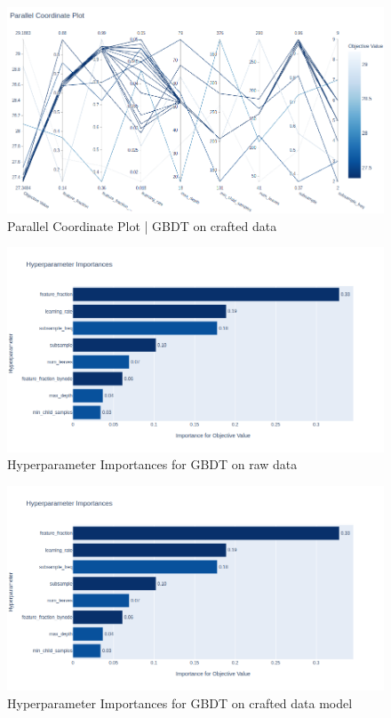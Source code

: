 \begin{figure}[h]
	\centering
	\includegraphics[width=\linewidth]{figures/HPO/GBDT_HPO_Crafted_ParallelPlot.png}
	\caption{Parallel Coordinate Plot | GBDT on crafted data}
	\label{fig:GBDT_HPO_Crafted_ParallelPlot}
\end{figure}
\begin{figure}[h]
	\centering
	\includegraphics[width=\linewidth]{figures/HPO/GBDT_HPO_Raw_Importances.png}
	\caption{Hyperparameter Importances for GBDT on raw data}
	\label{fig:GBDT_HPO_Raw}
\end{figure}
\begin{figure}[h]
	\centering
	\includegraphics[width=\linewidth]{figures/HPO/GBDT_HPO_Crafted_Importances.png}
	\caption{Hyperparameter Importances for GBDT on crafted data model}
	\label{fig:GBDT_HPO_Crafted}
\end{figure}

